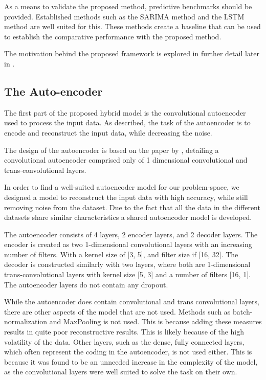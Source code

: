 As a means to validate the proposed method, predictive benchmarks should be provided.
Established methods such as the SARIMA method and the LSTM method are well suited for this.
These methods create a baseline that can be used to establish the comparative performance with the proposed method.

The motivation behind the proposed framework is explored in further detail later in .



\subsection{The Auto-encoder}

The first part of the proposed hybrid model is the convolutional autoencoder used to process the input data.
As described, the task of the autoencoder is to encode and reconstruct the input data,
while decreasing the noise.

The design of the autoencoder is based on the paper by \cite{Zhao2019},
detailing a convolutional autoencoder comprised only of 1 dimensional convolutional and trans-convolutional layers.


In order to find a well-suited autoencoder model for our problem-space,
we designed a model to reconstruct the input data with high accuracy,
while still removing noise from the dataset.
Due to the fact that all the data in the different datasets share similar characteristics
a shared autoencoder model is developed.

The autoencoder consists of 4 layers, 2 encoder layers, and 2 decoder layers.
The encoder is created as two 1-dimensional convolutional layers with an increasing number of filters.
With a kernel size of [3, 5], and filter size if [16, 32].
The decoder is constructed similarly with two layers, where both are 1-dimensional trans-convolutional layers
with kernel size [5, 3] and a number of filters [16, 1].
The autoencoder layers do not contain any dropout.


While the autoencoder does contain convolutional and trans convolutional layers,
there are other aspects of the model that are not used.
Methods such as batch-normalization and MaxPooling is not used.
This is because adding these measures results in quite poor reconstructive results.
This is likely because of the high volatility of the data.
Other layers, such as the dense, fully connected layers, which often represent the coding in the autoencoder,
is not used either.
This is because it was found to be an unneeded increase in the complexity of the model,
as the convolutional layers were well suited to solve the task on their own.


